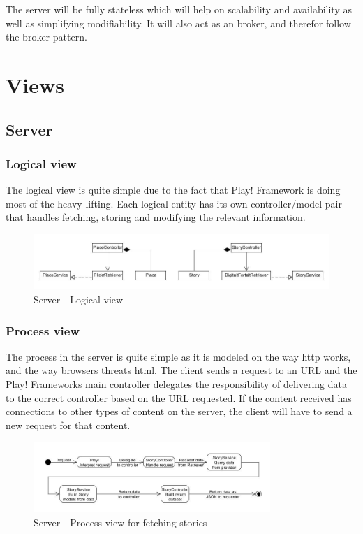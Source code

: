 \documentclass[11pt]{book}
\begin{document}
The server will be fully stateless which will help on scalability and availability as well as simplifying modifiability. It will also act as an broker, and therefor follow the broker pattern.

\section{Views}

\subsection{Server}

\subsubsection{Logical view}
The logical view is quite simple due to the fact that Play! Framework is doing most of the heavy lifting. Each logical entity has its own controller/model pair that handles fetching, storing and modifying the relevant information.

\begin{figure}[H]
      \centering
      \includegraphics[width=1.0\textwidth]{Figures/Architecture/serverLogical.jpg}
      \caption{Server - Logical view}
      \label{fig:arch_server_logical}
\end{figure}

\subsubsection{Process view}
The process in the server is quite simple as it is modeled on the way \gls{http} works, and the way browsers threats \gls{html}. The client sends a request to an URL and the Play! Frameworks main controller delegates the  responsibility of delivering data to the correct controller based on the URL requested. If the content received has connections to other types of content on the server, the client will have to send a new request for that content.

\begin{figure}[H]
      \centering
      \includegraphics[width=0.8\textwidth]{Figures/Architecture/serverProcessStory.jpg}
      \caption{Server - Process view for fetching stories}
      \label{fig:arch_server_process_story}
\end{figure}
\end{document}
